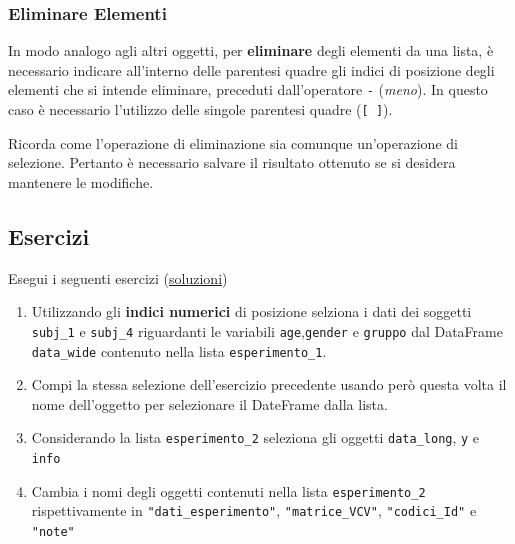 \documentclass[
]{book}
\newenvironment{Shaded}{\begin{snugshade}}{\end{snugshade}}
\newcommand{\CommentTok}[1]{\textcolor[rgb]{0.56,0.35,0.01}{\textit{#1}}}
\newcommand{\DecValTok}[1]{\textcolor[rgb]{0.00,0.00,0.81}{#1}}
\newcommand{\NormalTok}[1]{#1}
\newcommand{\OperatorTok}[1]{\textcolor[rgb]{0.81,0.36,0.00}{\textbf{#1}}}
\providecommand{\tightlist}{%
  \setlength{\itemsep}{0pt}\setlength{\parskip}{0pt}}
\begin{document}
\hypertarget{eliminare-elementi}{%
\subsubsection*{Eliminare Elementi}\label{eliminare-elementi}}

In modo analogo agli altri oggetti, per \textbf{eliminare} degli elementi da una lista, è necessario indicare all'interno delle parentesi quadre gli indici di posizione degli elementi che si intende eliminare, preceduti dall'operatore \texttt{-} (\emph{meno}). In questo caso è necessario l'utilizzo delle singole parentesi quadre (\texttt{{[}\ {]}}).

\begin{Shaded}
\end{Shaded}

Ricorda come l'operazione di eliminazione sia comunque un'operazione di selezione. Pertanto è necessario salvare il risultato ottenuto se si desidera mantenere le modifiche.

\hypertarget{esercizi-13}{%
\subsection*{Esercizi}\label{esercizi-13}}

Esegui i seguenti esercizi (\href{https://github.com/psicostat/Introduction2R/blob/master/exercises/chapter-11-lists.R}{soluzioni})

\begin{enumerate}
\def\labelenumi{\arabic{enumi}.}
\tightlist
\item
  Utilizzando gli \textbf{indici numerici} di posizione selziona i dati dei soggetti \texttt{subj\_1} e \texttt{subj\_4} riguardanti le variabili \texttt{age},\texttt{gender} e \texttt{gruppo} dal DataFrame \texttt{data\_wide} contenuto nella lista \texttt{esperimento\_1}.
\item
  Compi la stessa selezione dell'esercizio precedente usando però questa volta il nome dell'oggetto per selezionare il DateFrame dalla lista.
\item
  Considerando la lista \texttt{esperimento\_2} seleziona gli oggetti \texttt{data\_long}, \texttt{y} e \texttt{info}
\item
  Cambia i nomi degli oggetti contenuti nella lista \texttt{esperimento\_2} rispettivamente in \texttt{"dati\_esperimento"}, \texttt{"matrice\_VCV"}, \texttt{"codici\_Id"} e \texttt{"note"}
\end{enumerate}
\end{document}
